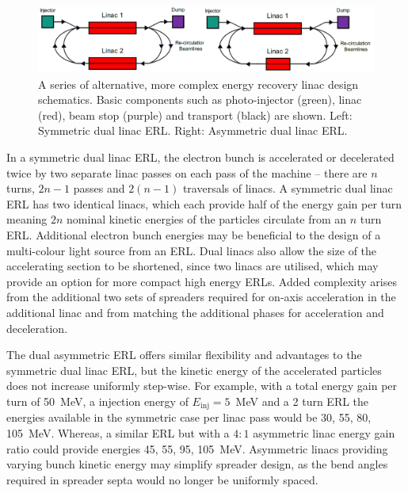 \documentclass[../main.tex]{subfiles}
\begin{document}
\begin{figure}[!h]
\centering
\includegraphics[width=\textwidth]{Figures/Energy_Recovery_Linac_Design/dual_linac_ERLs.pdf}
\caption{A series of alternative, more complex energy recovery linac design schematics. Basic components such as photo-injector (green), linac (red), beam stop (purple) and transport (black) are shown. Left: Symmetric dual linac ERL. Right: Asymmetric dual linac ERL.}
\label{fig:dual_linac_ERL_designs}
\end{figure}

In a symmetric dual linac ERL, the electron bunch is accelerated or decelerated twice by two separate linac passes on each pass of the machine -- there are $n$ turns, $2n-1$ passes and $2\left(n-1\right)$ traversals of linacs. A symmetric dual linac ERL has two identical linacs, which each provide half of the energy gain per turn meaning $2n$ nominal kinetic energies of the particles circulate from an $n$ turn ERL. Additional electron bunch energies may be beneficial to the design of a multi-colour light source from an ERL. Dual linacs also allow the size of the accelerating section to be shortened, since two linacs are utilised, which may provide an option for more compact high energy ERLs. Added complexity arises from the additional two sets of spreaders required for on-axis acceleration in the additional linac and from matching the additional phases for acceleration and deceleration. 

The dual asymmetric ERL offers similar flexibility and advantages to the symmetric dual linac ERL, but the kinetic energy of the accelerated particles does not increase uniformly step-wise. For example, with a total energy gain per turn of 50~\si{\mega\electronvolt}, a injection energy of $E_{\mathrm{inj}}=5$~\si{\mega\electronvolt} and a 2 turn ERL the energies available in the symmetric case per linac pass would be 30, 55, 80, 105~\si{\mega\electronvolt}. Whereas, a similar ERL but with a $4:1$ asymmetric linac energy gain ratio could provide energies 45, 55, 95, 105~\si{\mega\electronvolt}. Asymmetric linacs providing varying bunch kinetic energy may simplify spreader design, as the bend angles required in spreader septa would no longer be uniformly spaced.
\end{document}
